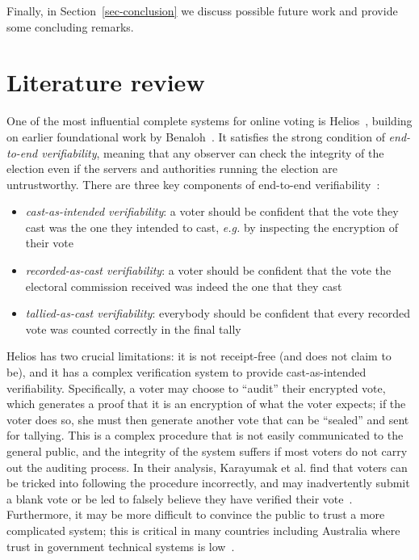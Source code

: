 \documentclass[12pt,a4paper]{article}
\theoremstyle{definition}
\newcommand{\eg}{\textit{e.g. }}
\begin{document}
Finally, in Section~\ref{sec-conclusion} we discuss possible future work and provide some concluding remarks.

\newpage
\section{Literature review}\label{sec-litrev}
One of the most influential complete systems for online voting is Helios~\cite{adida2008helios}, building on earlier foundational work by Benaloh~\cite{benaloh2006simple}. It satisfies the strong condition of \textit{end-to-end verifiability}, meaning that any observer can check the integrity of the election even if the servers and authorities running the election are untrustworthy. There are three key components of end-to-end verifiability~\cite{DBLP:journals/corr/BenalohRRSTV15}:

\begin{itemize}
    \item \textit{cast-as-intended verifiability}: a voter should be confident that the vote they cast was the one they intended to cast, \eg by inspecting the encryption of their vote
    \item \textit{recorded-as-cast verifiability}: a voter should be confident that the vote the electoral commission received was indeed the one that they cast
    \item \textit{tallied-as-cast verifiability}: everybody should be confident that every recorded vote was counted correctly in the final tally
\end{itemize}

Helios has two crucial limitations: it is not receipt-free (and does not claim to be), and it has a complex verification system to provide cast-as-intended verifiability. Specifically, a voter may choose to ``audit'' their encrypted vote, which generates a proof that it is an encryption of what the voter expects; if the voter does so, she must then generate another vote that can be ``sealed'' and sent for tallying. This is a complex procedure that is not easily communicated to the general public, and the integrity of the system suffers if most voters do not carry out the auditing process. In their analysis, Karayumak et al. find that voters can be tricked into following the procedure incorrectly, and may inadvertently submit a blank vote or be led to falsely believe they have verified their vote~\cite{karayumak2011usability}. Furthermore, it may be more difficult to convince the public to trust a more complicated system; this is critical in many countries including Australia where trust in government technical systems is low~\cite{blind2007building,horsburgh2011public}.
\end{document}
